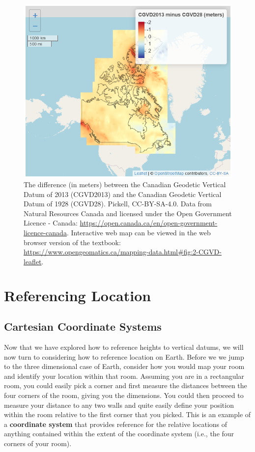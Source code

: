 \documentclass[
]{book}
\begin{document}
\begin{figure}
\includegraphics[width=1\linewidth]{images/02-CGVD-leaflet} \caption{The difference (in meters) between the Canadian Geodetic Vertical Datum of 2013 (CGVD2013) and the Canadian Geodetic Vertical Datum of 1928 (CGVD28). Pickell, CC-BY-SA-4.0. Data from Natural Resources Canada and licensed under the Open Government Licence - Canada: \url{https://open.canada.ca/en/open-government-licence-canada}. Interactive web map can be viewed in the web browser version of the textbook: \url{https://www.opengeomatics.ca/mapping-data.html\#fig:2-CGVD-leaflet}.}\label{fig:2-CGVD-leaflet}
\end{figure}

\section{Referencing Location}\label{referencing-location}

\subsection{Cartesian Coordinate Systems}\label{cartesian-coordinate-systems}

Now that we have explored how to reference heights to vertical datums, we will now turn to considering how to reference location on Earth. Before we we jump to the three dimensional case of Earth, consider how you would map your room and identify your location within that room. Assuming you are in a rectangular room, you could easily pick a corner and first measure the distances between the four corners of the room, giving you the dimensions. You could then proceed to measure your distance to any two walls and quite easily define your position within the room relative to the first corner that you picked. This is an example of a \textbf{coordinate system} that provides reference for the relative locations of anything contained within the extent of the coordinate system (i.e., the four corners of your room).
\end{document}

